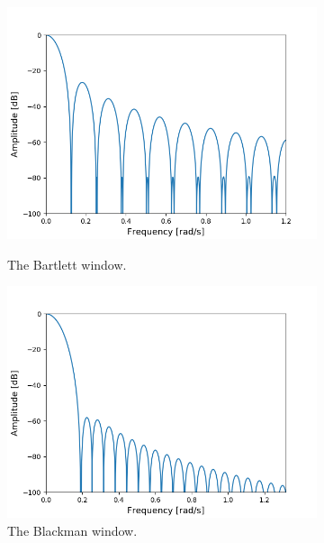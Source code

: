 \begin{figure}[H]
\centering
\begin{subfigure}{0.49\textwidth}
\centering
\includegraphics[width=\textwidth]{figures/dbplots/bartlett.png}
\caption{The Bartlett window.}
\label{fig:bartlett_db}
\includegraphics[width=\textwidth]{figures/dbplots/blackman.png}
\caption{The Blackman window.}
\label{fig:blackman_db}
\end{subfigure}
\begin{subfigure}{0.49\textwidth}
\centering

\end{subfigure}
\end{figure}
